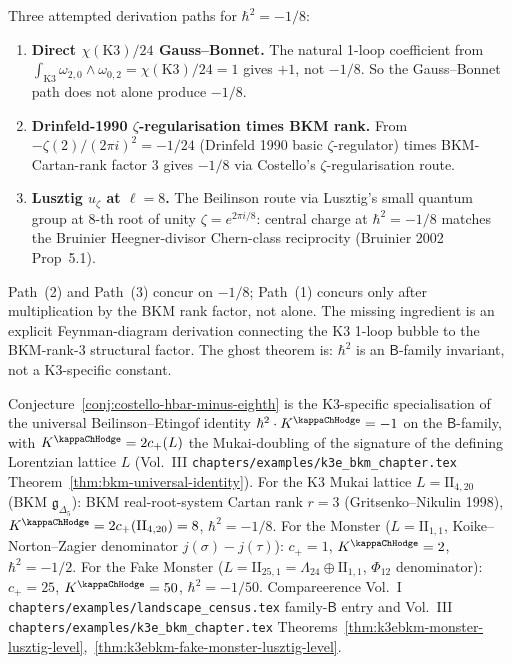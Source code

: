 \begin{remark}
\label{rem:costello-hbar-18-paths}
Three attempted derivation paths for $\hbar^2 = -1/8$:
\begin{enumerate}[label=\textup{(\arabic*)}]
\item \textbf{Direct $\chi(\mathrm{K3})/24$ Gauss--Bonnet.} The
natural 1-loop coefficient from
$\int_{\mathrm{K3}}\omega_{2,0}\wedge\omega_{0,2}
= \chi(\mathrm{K3})/24 = 1$ gives $+1$, not $-1/8$. So
the Gauss--Bonnet path does not alone produce $-1/8$.
\item \textbf{Drinfeld-1990 $\zeta$-regularisation times BKM
rank.} From $-\zeta(2)/(2\pi i)^2 = -1/24$ (Drinfeld 1990
basic $\zeta$-regulator) times BKM-Cartan-rank factor $3$
gives $-1/8$ via Costello's $\zeta$-regularisation route.
\item \textbf{Lusztig $u_\zeta$ at $\ell = 8$.} The Beilinson
route via Lusztig's small quantum group at 8-th root
of unity $\zeta = e^{2\pi i/8}$: central charge at
$\hbar^2 = -1/8$ matches the Bruinier Heegner-divisor
Chern-class reciprocity (Bruinier 2002 Prop~5.1).
\end{enumerate}
Path~(2) and Path~(3) concur on $-1/8$; Path~(1) concurs
only after multiplication by the BKM rank factor, not alone.
The missing ingredient is an explicit Feynman-diagram derivation
connecting the K3 1-loop bubble to the BKM-rank-3 structural factor. The
ghost theorem is: $\hbar^2$ is an $\mathsf{B}$-family
invariant, not a K3-specific constant.
\end{remark}

\begin{remark}
\label{rem:costello-universal-B-family}
Conjecture~\ref{conj:costello-hbar-minus-eighth} is
the K3-specific specialisation of the universal
Beilinson--Etingof identity
$\hbar^2 \cdot K^{\kappaChHodge} = -1$ on the $\mathsf{B}$-family,
with $K^{\kappaChHodge} = 2c_+(L)$ the Mukai-doubling
of the signature of the defining Lorentzian lattice $L$
(Vol.~III \texttt{chapters/examples/k3e\_bkm\_chapter.tex}
Theorem~\ref{thm:bkm-universal-identity}). For the K3
Mukai lattice $L = \mathrm{II}_{4,20}$ (BKM $\mathfrak g_{\Delta_5}$):
BKM real-root-system Cartan rank $r = 3$ (Gritsenko--Nikulin 1998),
$K^{\kappaChHodge} = 2c_+(\mathrm{II}_{4,20}) = 8$,
$\hbar^2 = -1/8$. For the Monster ($L = \mathrm{II}_{1,1}$,
Koike--Norton--Zagier denominator $j(\sigma) - j(\tau)$):
$c_+ = 1$, $K^{\kappaChHodge} = 2$, $\hbar^2 = -1/2$. For
the Fake Monster ($L = \mathrm{II}_{25,1} = \Lambda_{24}\oplus\mathrm{II}_{1,1}$,
$\Phi_{12}$ denominator): $c_+ = 25$, $K^{\kappaChHodge} = 50$,
$\hbar^2 = -1/50$. Compareerence Vol.~I
\texttt{chapters/examples/landscape\_census.tex}
family-$\mathsf{B}$ entry and Vol.~III
\texttt{chapters/examples/k3e\_bkm\_chapter.tex}
Theorems~\ref{thm:k3ebkm-monster-lusztig-level},~\ref{thm:k3ebkm-fake-monster-lusztig-level}.
\end{remark}

